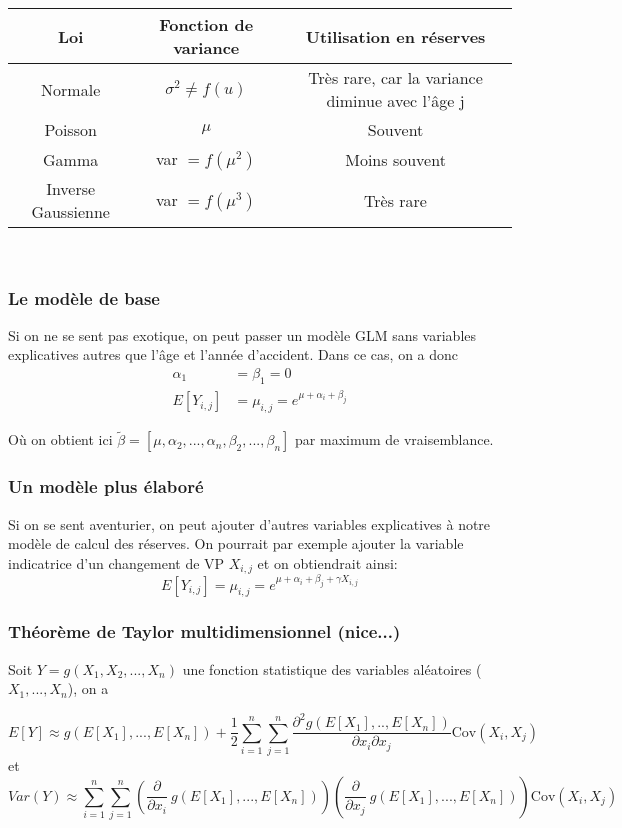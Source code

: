 \documentclass[11pt,french]{report}
\begin{document}
\begin{tabular}{|c|c|c|}
  \hline
   Loi & Fonction de variance & Utilisation en réserves  \\
  \hline
  Normale & $\sigma^2 \neq f(u)$ & Très rare, car la variance diminue avec l'âge j \\
  Poisson & $\mu$ & Souvent \\
  Gamma & var $ = f(\mu^2)$ & Moins souvent \\
  Inverse Gaussienne & var $ = f(\mu^3)$ & Très rare  \\
  \hline
\end{tabular}\\
\subsubsection*{Le modèle de base}

Si on ne se sent pas exotique, on peut passer un modèle GLM sans variables explicatives autres que l'âge et l'année d'accident. Dans ce cas, on a donc
$$\begin{aligned}
\alpha_1 &= \beta_1 = 0 \\
E[Y_{i,j}] &= \mu_{i,j} = e^{\mu + \alpha_i + \beta_j} 
\end{aligned}$$

Où on obtient ici $\tilde{\beta}=[\mu, \alpha_2,...,\alpha_n,\beta_2,...,\beta_n]$ par maximum de vraisemblance.

\subsubsection*{Un modèle plus élaboré}

Si on se sent aventurier, on peut ajouter d'autres variables explicatives à notre modèle de calcul des réserves. On pourrait par exemple ajouter la variable indicatrice d'un changement de VP $X_{i,j}$ et on obtiendrait ainsi:
$$E[Y_{i,j}]=\mu_{i,j} = e^{\mu + \alpha_i + \beta_j + \gamma X_{i,j}}$$

\subsubsection*{Théorème de Taylor multidimensionnel (nice...)}

Soit $Y=g(X_1,X_2,...,X_n)$ une fonction statistique des variables aléatoires ($X_1,...,X_n$), on a 

$$\boxed{E[Y] \approx g(E[X_1],...,E[X_n])+\frac{1}{2}\sum_{i=1}^n \sum_{j=1}^n \frac{\partial^2 g(E[X_1],..,E[X_n])}{\partial x_i \partial x_j}\text{Cov}(X_i,X_j)}$$
et
$$\boxed{Var(Y) \approx \sum_{i=1}^n \sum_{j=1}^n \left(\frac{\partial}{\partial x_i}\ g(E[X_1],...,E[X_n]) \right) \left(\frac{\partial}{\partial x_j}\ g(E[X_1],...,E[X_n]) \right) \text{Cov}(X_i, X_j)}$$
\end{document}
